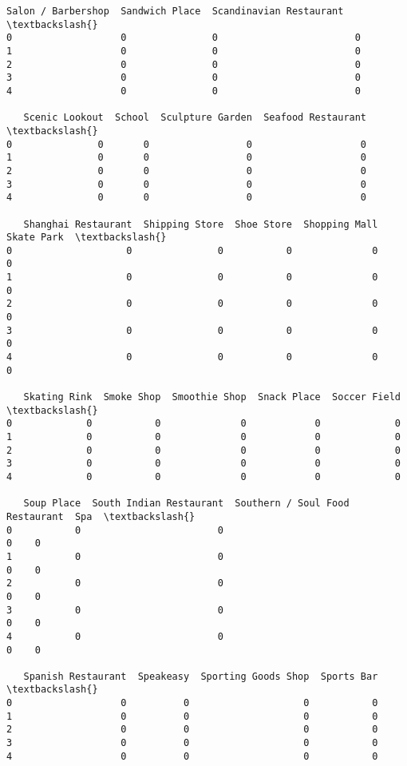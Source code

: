 \documentclass[11pt]{article}
\begin{document}
\begin{tcolorbox}[breakable, size=fbox, boxrule=.5pt, pad at break*=1mm, opacityfill=0]
\begin{Verbatim}[commandchars=\\\{\}]
   Salon / Barbershop  Sandwich Place  Scandinavian Restaurant  \textbackslash{}
0                   0               0                        0
1                   0               0                        0
2                   0               0                        0
3                   0               0                        0
4                   0               0                        0

   Scenic Lookout  School  Sculpture Garden  Seafood Restaurant  \textbackslash{}
0               0       0                 0                   0
1               0       0                 0                   0
2               0       0                 0                   0
3               0       0                 0                   0
4               0       0                 0                   0

   Shanghai Restaurant  Shipping Store  Shoe Store  Shopping Mall  Skate Park  \textbackslash{}
0                    0               0           0              0           0
1                    0               0           0              0           0
2                    0               0           0              0           0
3                    0               0           0              0           0
4                    0               0           0              0           0

   Skating Rink  Smoke Shop  Smoothie Shop  Snack Place  Soccer Field  \textbackslash{}
0             0           0              0            0             0
1             0           0              0            0             0
2             0           0              0            0             0
3             0           0              0            0             0
4             0           0              0            0             0

   Soup Place  South Indian Restaurant  Southern / Soul Food Restaurant  Spa  \textbackslash{}
0           0                        0                                0    0
1           0                        0                                0    0
2           0                        0                                0    0
3           0                        0                                0    0
4           0                        0                                0    0

   Spanish Restaurant  Speakeasy  Sporting Goods Shop  Sports Bar  \textbackslash{}
0                   0          0                    0           0
1                   0          0                    0           0
2                   0          0                    0           0
3                   0          0                    0           0
4                   0          0                    0           0


\end{Verbatim}
\end{tcolorbox}
\end{document}
